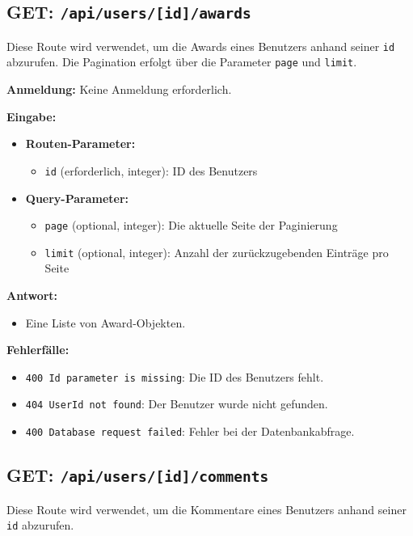 \documentclass[a4paper,12pt]{article}
\begin{document}
\newpage
\subsection{GET: \texttt{/api/users/[id]/awards}}

Diese Route wird verwendet, um die Awards eines Benutzers anhand seiner \texttt{id} abzurufen. Die Pagination erfolgt über die Parameter \texttt{page} und \texttt{limit}.

\textbf{Anmeldung:} Keine Anmeldung erforderlich.

\textbf{Eingabe:}
\begin{itemize}
    \item \textbf{Routen-Parameter:}
    \begin{itemize}
        \item \texttt{id} (erforderlich, integer): ID des Benutzers
    \end{itemize}
    \item \textbf{Query-Parameter:}
    \begin{itemize}
        \item \texttt{page} (optional, integer): Die aktuelle Seite der Paginierung
        \item \texttt{limit} (optional, integer): Anzahl der zurückzugebenden Einträge pro Seite
    \end{itemize}
\end{itemize}

\textbf{Antwort:}
\begin{itemize}
    \item Eine Liste von Award-Objekten.
\end{itemize}

\textbf{Fehlerfälle:}
\begin{itemize}
    \item \texttt{400 Id parameter is missing}: Die ID des Benutzers fehlt.
    \item \texttt{404 UserId not found}: Der Benutzer wurde nicht gefunden.
    \item \texttt{400 Database request failed}: Fehler bei der Datenbankabfrage.
\end{itemize}

\newpage
\subsection{GET: \texttt{/api/users/[id]/comments}}

Diese Route wird verwendet, um die Kommentare eines Benutzers anhand seiner \texttt{id} abzurufen.
\end{document}

